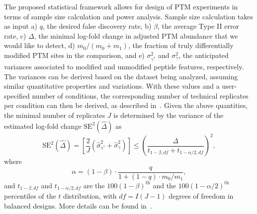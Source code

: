 \documentclass{mcp}
\begin{document}
The proposed statistical framework allows for design of PTM experiments in terms of sample size calculation and power analysis. 
Sample size calculation takes as input a) $q$, the desired false discovery rate, b) $\beta$, the average Type II error rate, c) $\Delta$, the minimal log-fold change in adjusted PTM abundance that we would like to detect, d) $m_0 / (m_0 + m_1)$, the fraction of truly differentially modified PTM sites in the comparison, and e) $\sigma_{\gamma^{\ast}}^{2}$ and $\sigma_{\gamma}^{2}$, the anticipated variances associated to modified and unmodified peptide features, respectively. The variances can be derived based on the dataset being analyzed, assuming similar quantitative properties and variations. With these values and a user-specified number of conditions, the corresponding number of technical replicates per condition can then be derived, as described in~\cite{kutner_etal_04a}. Given the above quantities, the minimal number of replicates $J$ is determined by the variance of the estimated log-fold change $\mathrm{SE}^{2}(\hat{\Delta})$ as
\[
\mathrm{SE}^{2}(\hat{\Delta}) = \left[ \frac{2}{J} \left( \hat{\sigma}_{\gamma^{\ast}}^{2} + \hat{\sigma}_{\gamma}^{2} \right) \right]
\leq \left( \frac{\Delta}{t_{1-\beta, df} + t_{1-\alpha /2, df}} \right)^{2},
\]
where 
\[
\alpha = (1 - \beta) \cdot \frac{q}{1 + (1-q) \cdot m_0 / m_1},
\]
and $t_{1-\beta, df}$ and $t_{1-\alpha /2, df}$ are the $100(1-\beta)^{\text{th}}$ and the $100(1-\alpha /2)^{\text{th}}$ percentiles of the $t$ distribution, with $df = I(J-1)$ degrees of freedom in balanced designs. More details can be found in~\cite{oberg_vitek_09a}. 
\end{document}
